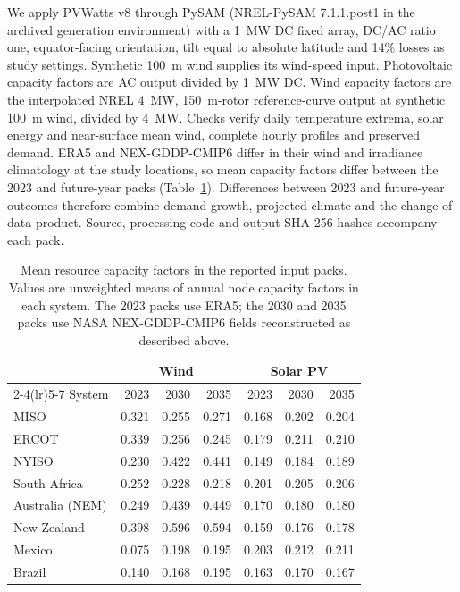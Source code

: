 \documentclass[pdflatex,sn-nature]{sn-jnl}
\begin{document}
We apply PVWatts v8 through PySAM (NREL-PySAM 7.1.1.post1 in the archived generation environment)\cite{pvwattsv8,pysampvwattsv8} with a 1~MW DC fixed array, DC/AC ratio one, equator-facing orientation, tilt equal to absolute latitude and 14\% losses as study settings. Synthetic 100~m wind supplies its wind-speed input. Photovoltaic capacity factors are AC output divided by 1~MW DC. Wind capacity factors are the interpolated NREL 4~MW, 150~m-rotor reference-curve output at synthetic 100~m wind, divided by 4~MW\cite{nrel_reference4mw150_curve}. Checks verify daily temperature extrema, solar energy and near-surface mean wind, complete hourly profiles and preserved demand. ERA5 and NEX-GDDP-CMIP6 differ in their wind and irradiance climatology at the study locations, so mean capacity factors differ between the 2023 and future-year packs (Table~\ref{tab:resource-cf}). Differences between 2023 and future-year outcomes therefore combine demand growth, projected climate and the change of data product. Source, processing-code and output SHA-256 hashes accompany each pack.

\begin{table}[tbp]
\caption{Mean resource capacity factors in the reported input packs. Values are unweighted means of annual node capacity factors in each system. The 2023 packs use ERA5; the 2030 and 2035 packs use NASA NEX-GDDP-CMIP6 fields reconstructed as described above.}
\label{tab:resource-cf}
\centering\small
\begin{tabular}{@{}lrrrrrr@{}}
\toprule
 & \multicolumn{3}{c}{Wind} & \multicolumn{3}{c}{Solar PV} \\
\cmidrule(lr){2-4}\cmidrule(lr){5-7}
System & 2023 & 2030 & 2035 & 2023 & 2030 & 2035 \\
\midrule
MISO & 0.321 & 0.255 & 0.271 & 0.168 & 0.202 & 0.204 \\
ERCOT & 0.339 & 0.256 & 0.245 & 0.179 & 0.211 & 0.210 \\
NYISO & 0.230 & 0.422 & 0.441 & 0.149 & 0.184 & 0.189 \\
South Africa & 0.252 & 0.228 & 0.218 & 0.201 & 0.205 & 0.206 \\
Australia (NEM) & 0.249 & 0.439 & 0.449 & 0.170 & 0.180 & 0.180 \\
New Zealand & 0.398 & 0.596 & 0.594 & 0.159 & 0.176 & 0.178 \\
Mexico & 0.075 & 0.198 & 0.195 & 0.203 & 0.212 & 0.211 \\
Brazil & 0.140 & 0.168 & 0.195 & 0.163 & 0.170 & 0.167 \\
\bottomrule
\end{tabular}
\end{table}
\end{document}
